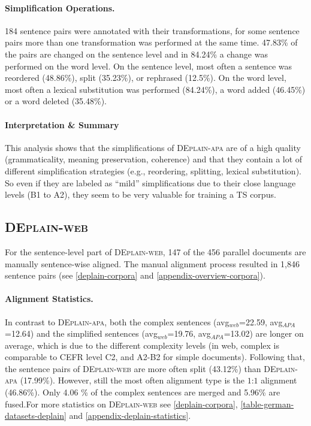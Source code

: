 \documentclass[11pt]{article}
\begin{document}
\paragraph{Simplification Operations.}
184 sentence pairs were annotated with their transformations, for some sentence pairs more than one transformation was performed at the same time. 47.83\% of the pairs are changed on the sentence level and in 84.24\% a change was performed on the word level. On the sentence level, most often a sentence was reordered (48.86\%), split (35.23\%), or rephrased (12.5\%). On the word level, most often a lexical substitution was performed (84.24\%), a word added (46.45\%) or a word deleted (35.48\%). 



\paragraph{Interpretation \& Summary}
This analysis shows that the simplifications of \textsc{DEplain-apa} are of a high quality (grammaticality, meaning preservation, coherence) and that they contain a lot of different simplification strategies (e.g., reordering, splitting, lexical substitution). So even if they are labeled as ``mild'' simplifications due to their close language levels (B1 to A2), they seem to be very valuable for training a TS corpus.



\subsection{\textsc{DEplain-web}}
\label{sec-deplain-web-sent}
For the sentence-level part of \textsc{DEplain-web}, 147 of the 456 parallel documents are manually sentence-wise aligned. The manual alignment process resulted in 1,846 sentence pairs 
(see \autoref{deplain-corpora} and \autoref{appendix-overview-corpora}).


\paragraph{Alignment Statistics.}
In contrast to \textsc{DEplain-apa}, both the complex sentences (avg$_{web}$=22.59, avg$_{APA}$=12.64) and the simplified sentences (avg$_{web}$=19.76, avg$_{APA}$=13.02) are longer on average, which is due to the different complexity levels (in web, complex is comparable to CEFR level C2, and A2-B2 for simple documents). Following that, the sentence pairs of \textsc{DEplain-web} are more often split (43.12\%) than \textsc{DEplain-apa} (17.99\%). However, still the most often alignment type is the $1$:$1$ alignment (46.86\%). Only 4.06 \% of the complex sentences are merged and 5.96\% are fused.For more statistics on \textsc{DEplain-web} see \autoref{deplain-corpora},  \autoref{table-german-datasets-deplain} and \autoref{appendix-deplain-statistics}.
\end{document}
